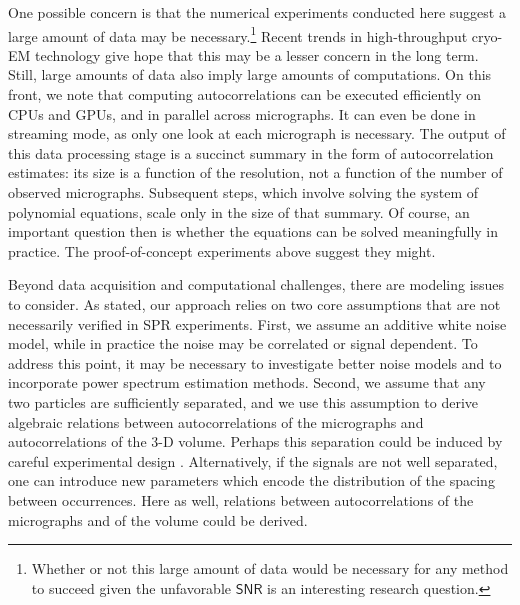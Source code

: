 \documentclass[english,11pt]{article}
\newcommand{\1}{\mathbf{1}}
\newcommand{\TODO}[1]{{\color{red}{[#1]}}}
\numberwithin{equation}{section}
\theoremstyle{plain}
\theoremstyle{definition}
\theoremstyle{remark}
\theoremstyle{plain}
\theoremstyle{remark}
\theoremstyle{plain}
\theoremstyle{plain}
\newcommand{\SNR}{\ensuremath{\textsf{SNR}}}
\begin{document}
One possible concern is that the numerical experiments conducted here suggest a large amount of data may be necessary.\footnote{Whether or not this large amount of data would be necessary for any method to succeed given the unfavorable $\SNR$ is an interesting research question.} Recent trends in high-throughput cryo-EM technology \TODO{?} give hope that this may be a lesser concern in the long term. Still, large amounts of data also imply large amounts of computations. On this front, we note that computing autocorrelations can be executed efficiently on CPUs and GPUs, and in parallel across micrographs. It can even be done in streaming mode, as only one look at each micrograph is necessary. The output of this data processing stage is a succinct summary in the form of autocorrelation estimates: its size is a function of the resolution, not a function of the number of observed micrographs. Subsequent steps, which involve solving the system of polynomial equations, scale only in the size of that summary. Of course, an important question then is whether the equations can be solved meaningfully in practice. The proof-of-concept experiments above suggest they might.




Beyond data acquisition and computational challenges, there are modeling issues to consider.
As stated, our approach relies on two core assumptions that are not necessarily verified in SPR experiments.
First, we assume an additive white noise model, while in practice the noise may be correlated or signal dependent. To address this point, it may be necessary to investigate better noise models and to incorporate power spectrum estimation methods. %
 Second, we assume that any two particles are sufficiently separated, and we use this assumption to derive algebraic relations between autocorrelations of the micrographs and autocorrelations of the 3-D volume. 
Perhaps this separation could be induced by careful experimental design \TODO{?}.
Alternatively, if the signals are not well separated, one can introduce new parameters which encode the distribution of the spacing between occurrences. Here as well, relations between autocorrelations of the micrographs and of the volume could be derived.
\end{document}
